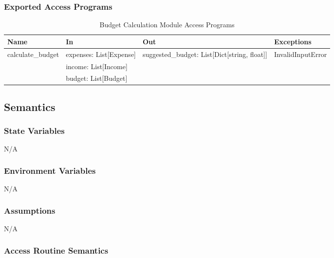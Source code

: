 \documentclass[12pt, titlepage]{article}
\begin{document}
\subsubsection{Exported Access Programs}

\begin{center}
\begin{table}[H]
  \caption{Budget Calculation Module Access Programs}
\begin{tabular}{p{4cm} p{4cm} p{4cm} p{4cm}}
\hline
\textbf{Name} & \textbf{In} & \textbf{Out} & \textbf{Exceptions} \\
\hline
calculate\_budget & expenses: List[Expense] & suggested\_budget: List[Dict[string, float]]
& InvalidInputError \\
& income: List[Income] & &  \\
& budget: List[Budget] & &  \\
\hline
\end{tabular}
\end{table}
\end{center}

\subsection{Semantics}

\subsubsection{State Variables}
N/A

\subsubsection{Environment Variables}
N/A

\subsubsection{Assumptions}
N/A

\subsubsection{Access Routine Semantics}
\end{document}
